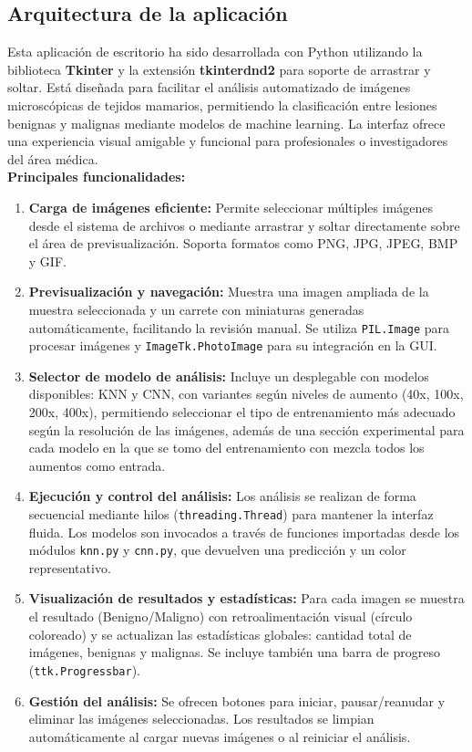\documentclass[12pt]{article} %
\begin{document}
\subsection{Arquitectura de la aplicación}
Esta aplicación de escritorio ha sido desarrollada con Python utilizando la biblioteca \textbf{Tkinter} y la extensión \textbf{tkinterdnd2} para soporte de arrastrar y soltar. Está diseñada para facilitar el análisis automatizado de imágenes microscópicas de tejidos mamarios, permitiendo la clasificación entre lesiones benignas y malignas mediante modelos de machine learning. La interfaz ofrece una experiencia visual amigable y funcional para profesionales o investigadores del área médica.\\

\textbf{Principales funcionalidades:} 

\begin{enumerate}
    \item \textbf{Carga de imágenes eficiente:}  Permite seleccionar múltiples imágenes desde el sistema de archivos o mediante arrastrar y soltar directamente sobre el área de previsualización. Soporta formatos como PNG, JPG, JPEG, BMP y GIF.

    \item \textbf{Previsualización y navegación:} Muestra una imagen ampliada de la muestra seleccionada y un carrete con miniaturas generadas automáticamente, facilitando la revisión manual. Se utiliza \textcolor[HTML]{006400}{\texttt{PIL.Image}} para procesar imágenes y \textcolor[HTML]{006400}{\texttt{ImageTk.PhotoImage}} para su integración en la GUI.
    \item \textbf{Selector de modelo de análisis:} Incluye un desplegable con modelos disponibles: KNN y CNN, con variantes según niveles de aumento (40x, 100x, 200x, 400x), permitiendo seleccionar el tipo de entrenamiento más adecuado según la resolución de las imágenes, además de una sección experimental para cada modelo en la que se tomo del entrenamiento con mezcla todos los aumentos como entrada.
    \item \textbf{Ejecución y control del análisis:} 
    Los análisis se realizan de forma secuencial mediante hilos (\textcolor[HTML]{006400}{\texttt{threading.Thread}}) para mantener la interfaz fluida. Los modelos son invocados a través de funciones importadas desde los módulos \textcolor[HTML]{006400}{\texttt{knn.py}} y \textcolor[HTML]{006400}{\texttt{cnn.py}}, que devuelven una predicción y un color representativo.
    \item \textbf{Visualización de resultados y estadísticas:}
    Para cada imagen se muestra el resultado (Benigno/Maligno) con retroalimentación visual (círculo coloreado) y se actualizan las estadísticas globales: cantidad total de imágenes, benignas y malignas. Se incluye también una barra de progreso (\textcolor[HTML]{006400}{\texttt{ttk.Progressbar}}).
    \item \textbf{Gestión del análisis:} 
    Se ofrecen botones para iniciar, pausar/reanudar y eliminar las imágenes seleccionadas. Los resultados se limpian automáticamente al cargar nuevas imágenes o al reiniciar el análisis.
\end{enumerate}
\end{document}
